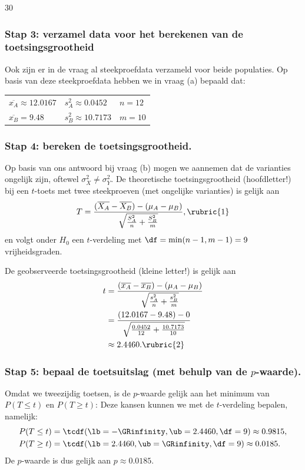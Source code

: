 \begin{question}{30}
{        \subsubsection*{Stap 3: verzamel data voor het berekenen van de toetsingsgrootheid}
        Ook zijn er in de vraag al steekproefdata verzameld voor beide populaties. 
        Op basis van deze steekproefdata hebben we in vraag (a) bepaald dat:
        
        \begin{center}
            \begin{tabular}{C{.3\textwidth} C{.3\textwidth} C{.3\textwidth}}
                $\overline{x_A} \approx 12.0167$ & $s_A^2 \approx 0.0452$ & $n = 12$ \\
                $\overline{x_B} = 9.48$ & $s_B^2 \approx 10.7173$ & $m = 10$
            \end{tabular}
        \end{center}

        \subsubsection*{Stap 4: bereken de toetsingsgrootheid.}
        Op basis van ons antwoord bij vraag (b) mogen we aannemen dat de varianties ongelijk zijn, oftewel $\sigma_X^2 \neq \sigma_Y^2$.
        De theoretische toetsingsgrootheid (hoofdletter!) bij een $t$-toets met twee steekproeven (met ongelijke varianties) is gelijk aan
        \[
            T = \frac{(\overline{X_A} - \overline{X_B}) - (\mu_A - \mu_B)}{\sqrt{\frac{S_A^2}{n} + \frac{S_B^2}{m}}}, \rubric{1}
        \]
        en volgt onder $H_0$ een $t$-verdeling met $\df=\min(n-1,m-1)=9$ vrijheidsgraden. 

        De geobserveerde toetsingsgrootheid (kleine letter!) is gelijk aan
        \begin{align*}
            t   &= \frac{(\overline{x_A}-\overline{x_B}) - (\mu_A - \mu_B)}{\sqrt{\frac{s_A^2}{n} + \frac{s_B^2}{m}}} \\
                &= \frac{(12.0167 - 9.48) - 0}{\sqrt{\frac{0.0452}{12} + \frac{10.7173}{10}}} \\
                &\approx 2.4460. \rubric{2}
        \end{align*}

        \subsubsection*{Stap 5: bepaal de toetsuitslag (met behulp van de $p$-waarde).}
        Omdat we tweezijdig toetsen, is de $p$-waarde gelijk aan het minimum van $P(T \leq t)$ en $P(T \geq t)$:
        Deze kansen kunnen we met de $t$-verdeling bepalen, namelijk:
        \begin{align*}
            P(T \leq t) &= \tcdf(\lb = -\GRinfinity, \ub=2.4460, \df=9) \approx 0.9815, \\ 
            P(T \geq t) &= \tcdf(\lb = 2.4460, \ub=\GRinfinity, \df=9) \approx 0.0185.
        \end{align*}
        De $p$-waarde is dus gelijk aan $p \approx 0.0185$. 

}
\end{question}
